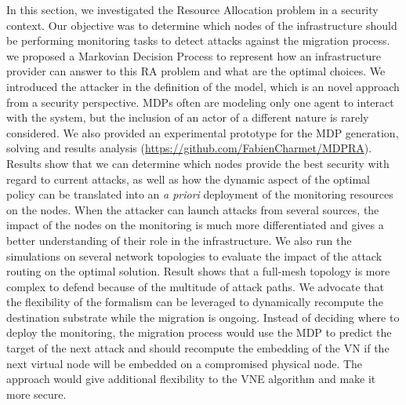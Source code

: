 \label{sec:mdp-conclusion}
In this section, we investigated the Resource Allocation problem in a security context. Our objective was to determine which nodes of the infrastructure should be performing monitoring tasks to detect attacks against the migration process.
we proposed a Markovian Decision Process to represent how an infrastructure provider can answer to this RA problem and what are the optimal choices.
We introduced the attacker in the definition of the model, which is an novel approach from a security perspective. MDPs often are modeling only one agent to interact with the system, but the inclusion of an actor of a different nature is rarely considered.
We also provided an experimental prototype for the MDP generation, solving and results analysis  (\url{https://github.com/FabienCharmet/MDPRA}).
Results show that we can determine which nodes provide the best security with regard to current attacks, as well as how the dynamic aspect of the optimal policy can be translated into an \textit{a priori} deployment of the monitoring resources on the nodes.
When the attacker can launch attacks from several sources, the impact of the nodes on the monitoring is much more differentiated and gives a better understanding of their role in the infrastructure.
We also run the simulations on several network topologies to evaluate the impact of the attack routing on the optimal solution. Result shows that a full-mesh topology is more complex to defend because of the multitude of attack paths.
We advocate that the flexibility of the formalism can be leveraged to dynamically recompute the destination substrate while the migration is ongoing.
Instead of deciding where to deploy the monitoring, the migration process would use the MDP to predict the target of the next attack and should recompute the embedding of the VN if the next virtual node will be embedded on a compromised physical node. The approach would give additional flexibility to the VNE algorithm and make it more secure.

